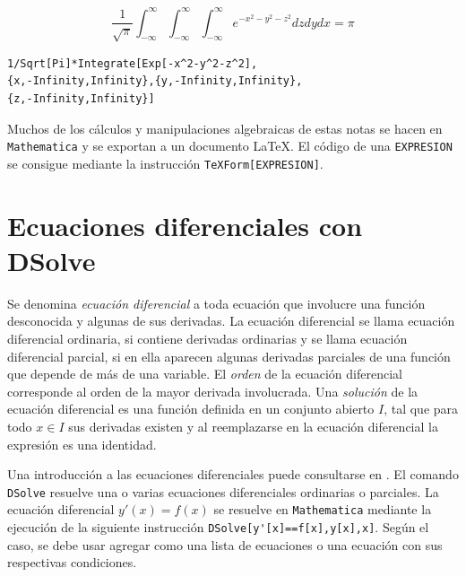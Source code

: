\begin{parrafonumerado}
\item %
\[\frac{1}{\sqrt{\pi }}\int_{-\infty}^{\infty}\int_{-\infty}^{\infty}\int_{-\infty}^{\infty}e^{-x^{2}-y^{2}-z^{2}}dzdydx= \pi \]
\begin{tcolorbox}
\begin{Verbatim}[formatcom=\letraverbatim]
1/Sqrt[Pi]*Integrate[Exp[-x^2-y^2-z^2],
{x,-Infinity,Infinity},{y,-Infinity,Infinity},
{z,-Infinity,Infinity}]
\end{Verbatim}
\end{tcolorbox}
\end{parrafonumerado}

Muchos de los cálculos y manipulaciones algebraicas de estas notas se hacen en \verb"Mathematica"
y se exportan a un documento \LaTeX.
El código de una \verb"EXPRESION" se consigue mediante la instrucción
\verb"TeXForm[EXPRESION]". 
\section{Ecuaciones diferenciales con DSolve}
Se denomina \emph{ecuación diferencial} a toda ecuación que involucre
una función desconocida y algunas de sus derivadas. La ecuación
diferencial se llama ecuación diferencial ordinaria, si contiene
derivadas ordinarias y se llama ecuación diferencial parcial, si en ella
aparecen algunas derivadas parciales de una función que depende de más de una variable.
El \emph{orden} de la ecuación diferencial corresponde al orden de la mayor derivada involucrada.
Una \emph{solución} de la ecuación diferencial es una función definida en un conjunto abierto $I$, tal que para todo $x\in I$ sus derivadas existen y al reemplazarse en la ecuación diferencial la expresión es una identidad.

Una introducción a las ecuaciones diferenciales puede consultarse en \textcite{apostol_calculus_1999}.
El comando \verb"DSolve"  resuelve una o varias ecuaciones diferenciales ordinarias o parciales.
La ecuación diferencial $y'(x)=f(x)$ se resuelve en \verb"Mathematica" mediante la ejecución de la siguiente instrucción
\verb"DSolve[y'[x]==f[x],y[x],x]". Según el caso, se debe usar agregar como una lista de ecuaciones o una ecuación con sus respectivas condiciones.

